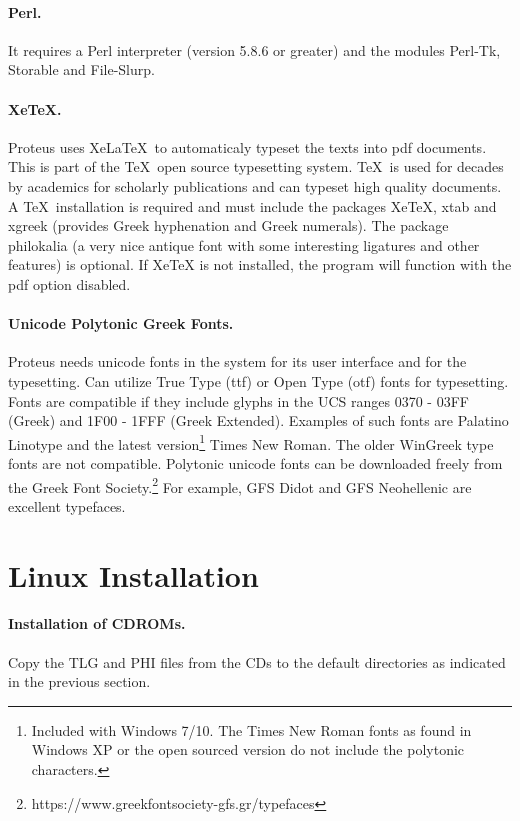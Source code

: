 \documentclass[11pt,a4paper]{article}
\begin{document}
  \paragraph{Perl.}
  It requires a Perl interpreter (version 5.8.6 or greater) and the
  modules Perl-Tk, Storable and File-Slurp.
  \paragraph{XeTeX.}
  Proteus uses XeLaTeX\ to automaticaly typeset the texts into pdf documents.
  This is part of the \TeX\ open source typesetting system. \TeX\ is used
  for decades by academics for scholarly publications and can typeset high
  quality documents. A \TeX\ installation is
  required and must include the packages XeTeX, xtab and xgreek
  (provides Greek hyphenation and Greek numerals). The package philokalia
  (a very nice antique font with some interesting ligatures and other features)
  is optional.  If XeTeX is not
  installed, the program will function with the pdf option disabled.
  \paragraph{Unicode Polytonic Greek Fonts.}
    Proteus needs unicode fonts in the system for its user interface
    and for the typesetting.
    Can utilize True Type (ttf) or Open Type (otf) fonts for typesetting.
    Fonts are compatible if they include glyphs in the UCS ranges
    0370 - 03FF (Greek) and 1F00 - 1FFF (Greek Extended).
    Examples of such fonts are Palatino Linotype and the latest version\footnote{
                Included with Windows 7/10.
                The Times New Roman fonts as found
                in Windows XP or the open sourced version do not include the
                 polytonic characters.}
    Times New Roman.  The older WinGreek type fonts are not compatible.
    Polytonic unicode fonts can be downloaded freely
    from the Greek Font Society.\footnote{
                https://www.greekfontsociety-gfs.gr/typefaces
                }
    For example, GFS Didot and GFS Neohellenic are excellent typefaces.
\section{Linux Installation}

    \paragraph{Installation of CDROMs.}Copy the TLG and PHI files from the CDs
    to the default directories as indicated in the previous section.
\end{document}
